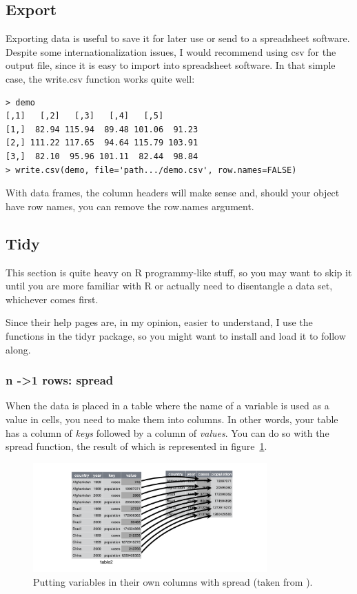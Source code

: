 \documentclass{report}
\newcommand{\code}[1]{\textsf{\ttfamily #1}}
\begin{document}
		\subsection{Export}
		Exporting data is useful to save it for later use or send to a spreadsheet software. Despite some internationalization issues, I would recommend using csv for the output file, since it is easy to import into spreadsheet software. In that simple case, the \code{write.csv} function works quite well:
		\begin{verbatim}
> demo
[,1]   [,2]   [,3]   [,4]   [,5]
[1,]  82.94 115.94  89.48 101.06  91.23
[2,] 111.22 117.65  94.64 115.79 103.91
[3,]  82.10  95.96 101.11  82.44  98.84
> write.csv(demo, file='path.../demo.csv', row.names=FALSE)
		\end{verbatim}
		
		With data frames, the column headers will make sense and, should your object have row names, you can remove the \code{row.names} argument.
		
		\subsection{Tidy}\label{subsec:tidy}
		This section is quite heavy on R programmy-like stuff, so you may want to skip it until you are more familiar with R or actually need to disentangle a data set, whichever comes first.
		
		Since their help pages are, in my opinion, easier to understand, I use the functions in the \code{tidyr} package, so you might want to install and load it to follow along.
		
		\subsubsection{n -\textgreater 1 rows: \code{spread}}
		When the data is placed in a table where the name of a variable is used as a value in cells, you need to make them into columns. In other words, your table has a column of \emph{keys} followed by a column of \emph{values}. You can do so with the \code{spread} function, the result of which is represented in figure~\ref{fig:spread}.
		\begin{figure}[h]
			\centering
			\includegraphics[width=0.8\textwidth]{spread.png}
			\caption{Putting variables in their own columns with \code{spread} (taken from \cite{tidy}).}
			\label{fig:spread}
		\end{figure}
		
\end{document}
